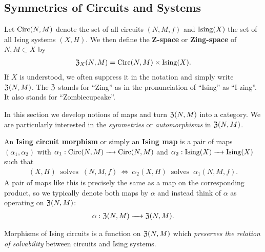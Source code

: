 \documentclass{article}
\begin{document}
\subsection{Symmetries of Circuits and Systems}

Let $\operatorname{Circ}(N,M)$ denote the set of all circuits $(N,M,f)$ and $\operatorname{Ising}(X)$ the set of all Ising systems $(X, H)$. We then define the \textbf{Z-space} or \textbf{Zing-space} of $N, M \subset X$ by
\begin{align*}
  \operatorname{\mathfrak{Z}}_X(N,M) = \operatorname{Circ}(N,M)\times \operatorname{Ising}(X).
\end{align*}
If $X$ is understood, we often suppress it in the notation and simply write $\operatorname{\mathfrak{Z}}(N,M)$. The $\operatorname{\mathfrak{Z}}$ stands for ``Zing'' as in the pronunciation of ``Ising'' as ``I-zing''. It also stands for ``Zombiecupcake''.

In this section we develop notions of maps and turn $\operatorname{\mathfrak{Z}}(N,M)$ into a category. We are particularly interested in the \emph{symmetries} or \emph{automorphisms} in $\operatorname{\mathfrak{Z}}(N,M)$.

\begin{defn}\label{defn:ising-symmetry}
  An \textbf{Ising circuit morphism} or simply an \textbf{Ising map} is a pair of maps $(\alpha_1, \alpha_2)$ with $\alpha_1:\Circ(N,M) \to \Circ(N,M)$ and $\alpha_2:\Ising(X) \to \Ising(X)$ such that
  \begin{align*}
    (X,H) ~ \text{ solves } ~ (N,M,f) ~ \Leftrightarrow~ \alpha_2(X,H) ~ \text{ solves } ~ \alpha_1(N,M,f).
  \end{align*}
  A pair of maps like this is precisely the same as a map on the corresponding product, so we typically denote both maps by $\alpha$ and instead think of $\alpha$ as operating on $\operatorname{\mathfrak{Z}}(N,M)$:
  \begin{align*}
    \alpha: \Zing(N,M) \to \Zing(N,M).
  \end{align*}
\end{defn}

Morphisms of Ising circuits is a function on $\operatorname{\mathfrak{Z}}(N,M)$ which \emph{preserves the relation of solvability} between circuits and Ising systems.
\end{document}
